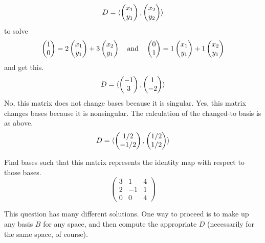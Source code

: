 \begin{exercises}
\begin{answer}
\begin{exparts}
\begin{equation*}
            D=\langle\begin{pmatrix} x_1 \\ y_1 \end{pmatrix},
                        \begin{pmatrix} x_2 \\ y_2 \end{pmatrix}\rangle
          \end{equation*}
          to solve 
          \begin{equation*}
            \begin{pmatrix} 1 \\ 0 \end{pmatrix}
            =2\begin{pmatrix} x_1 \\ y_1 \end{pmatrix}+3\begin{pmatrix} x_2 \\ y_1 \end{pmatrix}
            \quad\text{and}\quad
            \begin{pmatrix} 0 \\ 1 \end{pmatrix}
            =1\begin{pmatrix} x_1 \\ y_1 \end{pmatrix}+1\begin{pmatrix} x_2 \\ y_1 \end{pmatrix}
          \end{equation*}
          and get this.
          \begin{equation*}
            D=\langle\begin{pmatrix} -1 \\ 3 \end{pmatrix},
                        \begin{pmatrix} 1 \\ -2 \end{pmatrix}\rangle
          \end{equation*}
        \partsitem No, this matrix does not change bases because it
           is singular.
        \partsitem Yes, this matrix changes bases because it is nonsingular.
          The calculation of the changed-to basis is as above. 
          \begin{equation*}
            D=\langle\begin{pmatrix} 1/2 \\ -1/2 \end{pmatrix},
                        \begin{pmatrix} 1/2 \\ 1/2 \end{pmatrix}\rangle
          \end{equation*}
      \end{exparts}  
    \end{answer}
  \item 
    Find bases such that this matrix represents the identity map
    with respect to those bases.
    \begin{equation*}
      \begin{pmatrix}
        3  &1  &4  \\
        2  &-1 &1  \\
        0  &0  &4
      \end{pmatrix}
    \end{equation*}
    \begin{answer}
      This question has many different solutions.
      One way to proceed is to make up any basis $B$ for any space,
      and then compute the appropriate $D$ (necessarily for the same space,
      of course).

\end{answer}
\end{exercises}
